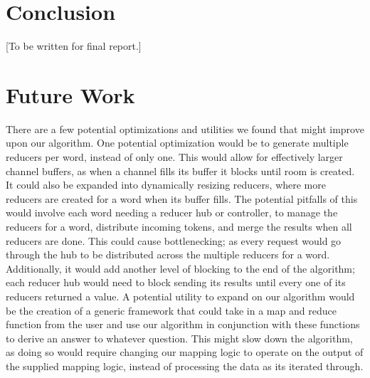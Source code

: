 \documentclass[report]{IEEEtran}
\begin{document}

\FloatBarrier

\section{Conclusion}
[To be written for final report.]

\section{Future Work}

There are a few potential optimizations and utilities we found that might improve upon our algorithm. One potential optimization would be to generate multiple reducers per word, instead of only one. This would allow for effectively larger channel buffers, as when a channel fills its buffer it blocks until room is created. It could also be expanded into dynamically resizing reducers, where more reducers are created for a word when its buffer fills. The potential pitfalls of this would involve each word needing a reducer hub or controller, to manage the reducers for a word, distribute incoming tokens, and merge the results when all reducers are done. This could cause bottlenecking; as every request would go through the hub to be distributed across the multiple reducers for a word. Additionally, it would add another level of blocking to the end of the algorithm; each reducer hub would need to block sending its results until every one of its reducers returned a value. A potential utility to expand on our algorithm would be the creation of a generic framework that could take in a map and reduce function from the user and use our algorithm in conjunction with these functions to derive an answer to whatever question. This might slow down the algorithm, as doing so would require changing our mapping logic to operate on the output of the supplied mapping logic, instead of processing the data as its iterated through.
\end{document}
